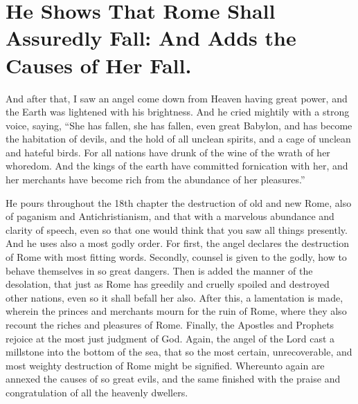 \chapter[Sermon 77. He Shows That Rome Shall Assuredly Fall: And Adds the Causes of Her Fall.]{He Shows That Rome Shall Assuredly Fall: And Adds the Causes of Her Fall.}
\label{sermon:077}

And after that, I saw an angel come down from Heaven having great power, and the Earth was lightened with his brightness. And he cried mightily with a strong voice, saying, “She has fallen, she has fallen, even great Babylon, and has become the habitation of devils, and the hold of all unclean spirits, and a cage of unclean and hateful birds. For all nations have drunk of the wine of the wrath of her whoredom. And the kings of the earth have committed fornication with her, and her merchants have become rich from the abundance of her pleasures.”

He pours throughout the 18th chapter the destruction of old and new Rome, also of paganism and Antichristianism, and that with a marvelous abundance and clarity of speech, even so that one would think that you saw all things presently. And he uses also a most godly order. For first, the angel declares the destruction of Rome with most fitting words. Secondly, counsel is given to the godly, how to behave themselves in so great dangers. Then is added the manner of the desolation, that just as Rome has greedily and cruelly spoiled and destroyed other nations, even so it shall befall her also. After this, a lamentation is made, wherein the princes and merchants mourn for the ruin of Rome, where they also recount the riches and pleasures of Rome. Finally, the Apostles and Prophets rejoice at the most just judgment of God. Again, the angel of the Lord cast a millstone into the bottom of the sea, that so the most certain, unrecoverable, and most weighty destruction of Rome might be signified. Whereunto again are annexed the causes of so great evils, and the same finished with the praise and congratulation of all the heavenly dwellers.

